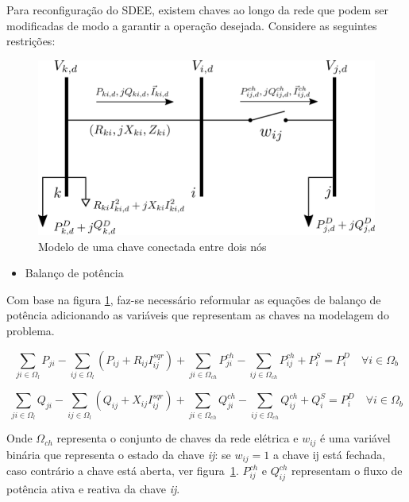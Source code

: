 Para reconfiguração do SDEE, existem chaves ao longo da rede que podem ser modificadas de modo a garantir a operação desejada.
Considere as seguintes restrições:

\begin{figure}[H]
    \centering
    \includegraphics[scale = 1.5]{4_Modeling/diagrama_chaves.png}
    \caption{Modelo de uma chave conectada entre dois nós}
    \label{fig:diagrama_chave}
\end{figure}
    
\begin{itemize}
    \item Balanço de potência
\end{itemize}
    Com base na figura \ref{fig:diagrama_chave}, faz-se necessário reformular as equações de balanço de potência adicionando as variáveis que representam as chaves na modelagem do problema.

\begin{equation}
    \sum_{ji\in\Omega_{l}}P_{ji} - \sum_{ij\in\Omega_{l}}(P_{ij} + R_{ij}I_{ij}^{sqr})+ \sum_{ji\in\Omega_{ch}}P_{ji}^{ch} -\sum_{ij\in\Omega_{ch}}P_{ij}^{ch} + P_{i}^{S} = P_{i}^{D}\quad\forall i \in\Omega_{b}\label{eq:fluxo_pot_ativa_chaves}  
\end{equation}
    
    
\begin{equation}
    \sum_{ji\in\Omega_{l}}Q_{ji} - \sum_{ij\in\Omega_{l}}(Q_{ij} + X_{ij}I_{ij}^{sqr})+ \sum_{ji\in\Omega_{ch}}Q_{ji}^{ch} -\sum_{ij\in\Omega_{ch}}Q_{ij}^{ch} + Q_{i}^{S} = P_{i}^{D}\quad\forall i \in\Omega_{b}
    \label{eq:fluxo_pot_reativa_chaves}
\end{equation}
    
Onde $\Omega_{ch}$ representa o conjunto de chaves da rede elétrica e $w_{ij}$ é uma variável binária que representa o estado da chave \textit{ij}: se $w_{ij} = 1$ a chave ij está fechada, caso contrário a chave está aberta, ver figura~\ref{fig:diagrama_chave}. $P_{ij}^{ch}$ e $Q_{ij}^{ch}$ representam o fluxo de potência ativa e reativa da chave \textit{ij}.

